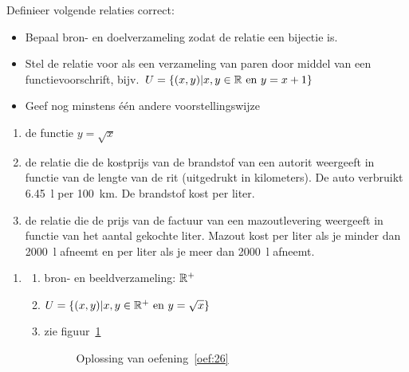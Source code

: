 \begin{oef}
\label{oef:26}
Definieer volgende relaties correct:
\begin{itemize}
\item Bepaal bron- en doelverzameling zodat de relatie een bijectie is.
\item Stel de relatie voor als een verzameling van paren door middel van een functievoorschrift, bijv.\ $U=\{(x,y)|x,y\in \mathbb{R}\text{ en } y=x+1\}$
\item Geef nog minstens één andere voorstellingswijze
\end{itemize}
\begin{enumerate}
\item de functie $y=\sqrt{x}$
\item de relatie die de kostprijs van de brandstof van een autorit weergeeft in functie van de lengte van de rit (uitgedrukt in kilometers). De auto verbruikt \SI{6,45}{\litre} per \SI{100}{\kilo\meter}. De brandstof kost  per liter.
\item de relatie die de prijs van de factuur van een mazoutlevering weergeeft in functie van het aantal gekochte liter. Mazout kost  per liter als je minder dan \SI{2000}{\litre} afneemt en  per liter als je meer dan \SI{2000}{\litre} afneemt.
\end{enumerate}
\begin{opl}
\begin{enumerate}
\item 
\begin{enumerate}
\item bron- en beeldverzameling: $\mathbb{R}^+$
\item $U=\{(x,y)|x,y\in \mathbb{R}^+\text{ en } y=\sqrt{x} \}$
\item zie figuur~\ref{oef:opl26}
\begin{figure}[htbp]
\centering
{}
\caption{Oplossing van oefening~\ref{oef:26} }
\label{oef:opl26}
\end{figure}
\end{enumerate}



\end{enumerate}
\end{opl}
\end{oef}
